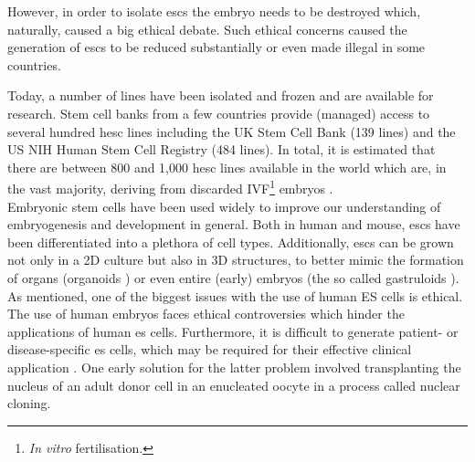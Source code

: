 However, in order to isolate \glspl{esc} the embryo needs to be destroyed which, naturally, caused a big ethical debate.
Such ethical concerns caused the generation of \glspl{esc} to be reduced substantially or even made illegal in some countries.

Today, a number of lines have been isolated and frozen and are available for research.
Stem cell banks from a few countries provide (managed) access to several hundred \gls{hesc} lines including the UK Stem Cell Bank (139 lines) and the US NIH Human Stem Cell Registry (484 lines).
In total, it is estimated that there are between 800 and 1,000 \gls{hesc} lines available in the world which are, in the vast majority, deriving from discarded IVF\footnote{\textit{In vitro} fertilisation.} embryos \cite{isasi2009governing}.\\


Embryonic stem cells have been used widely to improve our understanding of embryogenesis and development in general. 
Both in human and mouse, \glspl{esc} have been differentiated into a plethora of cell types.
Additionally, \glspl{esc} can be grown not only in a 2D culture but also in 3D structures, to better mimic the formation of organs (organoids \cite{clevers2016modeling, lancaster2013cerebral}) or even entire (early) embryos (the so called gastruloids \cite{van2020single2}).\\





As mentioned, one of the biggest issues with the use of human ES cells is ethical.
The use of human embryos faces ethical controversies which hinder the applications of human \gls{es} cells. 
Furthermore, it is difficult to generate patient- or disease-specific \gls{es} cells, which may be required for their effective clinical application \cite{yamanaka2007strategies}.
One early solution for the latter problem involved transplanting the nucleus of an adult donor cell in an enucleated oocyte in a process called nuclear cloning.

